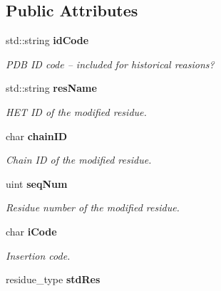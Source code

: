 \subsection*{Public Attributes}
\begin{CompactItemize}
\item 
std::string \bf{id\-Code}\label{structSimSite3D_1_1PDBBase_1_1modres__record__type_6a68803756d56ad22aa52b64a0ff3c5c}

\begin{CompactList}\small\item\em PDB ID code -- included for historical reasions? \item\end{CompactList}\item 
std::string \bf{res\-Name}\label{structSimSite3D_1_1PDBBase_1_1modres__record__type_bed137d971bf629a1ae314a15abe02a0}

\begin{CompactList}\small\item\em HET ID of the modified residue. \item\end{CompactList}\item 
char \bf{chain\-ID}\label{structSimSite3D_1_1PDBBase_1_1modres__record__type_4646af5f898e7f605c660c6a03e99326}

\begin{CompactList}\small\item\em Chain ID of the modified residue. \item\end{CompactList}\item 
uint \bf{seq\-Num}\label{structSimSite3D_1_1PDBBase_1_1modres__record__type_8e7203fd189ff474fb4df62d4c7370a5}

\begin{CompactList}\small\item\em Residue number of the modified residue. \item\end{CompactList}\item 
char \bf{i\-Code}\label{structSimSite3D_1_1PDBBase_1_1modres__record__type_ce2a7c9abb09dbdb2e3bcef4e4d8452c}

\begin{CompactList}\small\item\em Insertion code. \item\end{CompactList}\item 
residue\_\-type \bf{std\-Res}\label{structSimSite3D_1_1PDBBase_1_1modres__record__type_875e1b41b9c3d177a3d41bbe4d629ea1}


\end{CompactItemize}
